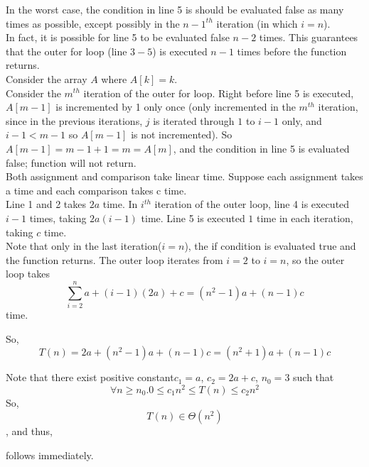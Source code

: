 \documentclass[11pt, answers]{exam}
\theoremstyle{plain}
\theoremstyle{definition}
\begin{document}
\begin{questions}
\begin{solution}
In the worst case, the condition in line 5 is should be evaluated false as many times as possible, except possibly in the $n-1^{th}$ iteration (in which $i=n$). \\
In fact, it is possible for line 5 to be evaluated false $n-2$ times. This guarantees that the outer for loop (line $3-5$) is executed $n-1$ times before the function returns.\\
Consider the array $A$ where $A[k]=k$.\\
Consider the $m^{th}$ iteration of the outer for loop. Right before line 5 is executed, $A[m-1]$ is incremented by 1 only once (only incremented in the $m^{th}$ iteration, since in the previous iterations, $j$ is iterated through $1$ to $i-1$ only, and $i-1<m-1$ so $A[m-1]$ is not incremented). So $A[m-1]=m-1+1=m=A[m]$, and the condition in line 5 is evaluated false; function will not return.\\
Both assignment and comparison take linear time. Suppose each assignment takes a time and each comparison takes c time.\\
Line 1 and 2 takes $2a$ time. In $i^{th}$ iteration of the outer loop, line 4 is executed $i-1$ times, taking $2a(i-1)$ time. Line 5 is executed $1$ time in each iteration, taking $c$ time. \\Note that only in the last iteration($i=n$), the if condition is evaluated true and the function returns. The outer loop iterates from $i=2$ to $i=n$, so the outer loop takes $$\sum_{i=2}^{n} a+(i-1)(2a)+c=(n^2-1)a+(n-1)c$$ time.

So, $$T(n)=2a+(n^2-1)a+(n-1)c=(n^2+1)a+(n-1)c$$

Note that there exist positive constant$c_1=a$, $c_2=2a+c$, $n_0=3$ such that $$\forall n\geq n_0. 0\leq c_1n^2 \leq T(n) \leq c_2n^2$$
So, $$T(n) \in \Theta(n^2)$$, and thus,
follows immediately.
\end{solution}


\end{questions}
\end{document}
